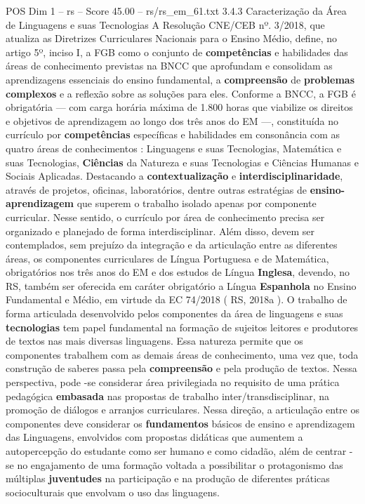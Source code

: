 \begin{textsample}{POS Dim 1 – rs – Score 45.00 – rs/rs\_em\_61.txt}  \label{ex:f1_pos_207}
3.4.3 Caracterização da Área de Linguagens e suas Tecnologias A Resolução CNE/CEB nº. 3/2018, que atualiza as Diretrizes Curriculares Nacionais para o Ensino Médio, define, no artigo 5º, inciso I, a FGB como o conjunto de \textbf{competências} e habilidades das áreas de conhecimento previstas na BNCC que aprofundam e consolidam as aprendizagens essenciais do ensino fundamental, a \textbf{compreensão} de \textbf{problemas} \textbf{complexos} e a reflexão sobre as soluções para eles.
Conforme a BNCC, a FGB é obrigatória — com carga horária máxima de 1.800 horas que viabilize os direitos e objetivos de aprendizagem ao longo dos três anos do EM —, constituída no currículo por \textbf{competências} específicas e habilidades em consonância com as quatro áreas de conhecimentos : Linguagens e suas Tecnologias, Matemática e suas Tecnologias, \textbf{Ciências} da Natureza e suas Tecnologias e Ciências Humanas e Sociais Aplicadas.
Destacando a \textbf{contextualização} e \textbf{interdisciplinaridade}, através de projetos, oficinas, laboratórios, dentre outras estratégias de \textbf{ensino-aprendizagem} que superem o trabalho isolado apenas por componente curricular.
Nesse sentido, o currículo por área de conhecimento precisa ser organizado e planejado de forma interdisciplinar.
Além disso, devem ser contemplados, sem prejuízo da integração e da articulação entre as diferentes áreas, os componentes curriculares de Língua Portuguesa e de Matemática, obrigatórios nos três anos do EM e dos estudos de Língua \textbf{Inglesa}, devendo, no RS, também ser oferecida em caráter obrigatório a Língua \textbf{Espanhola} no Ensino Fundamental e Médio, em virtude da EC 74/2018 ( RS, 2018a ).
O trabalho de forma articulada desenvolvido pelos componentes da área de linguagens e suas \textbf{tecnologias} tem papel fundamental na formação de sujeitos leitores e produtores de textos nas mais diversas linguagens.
Essa natureza permite que os componentes trabalhem com as demais áreas de conhecimento, uma vez que, toda construção de saberes passa pela \textbf{compreensão} e pela produção de textos.
Nessa perspectiva, pode -se considerar área privilegiada no requisito de uma prática pedagógica \textbf{embasada} nas propostas de trabalho inter/transdisciplinar, na promoção de diálogos e arranjos curriculares.
Nessa direção, a articulação entre os componentes deve considerar os \textbf{fundamentos} básicos de ensino e aprendizagem das Linguagens, envolvidos com propostas didáticas que aumentem a autopercepção do estudante como ser humano e como cidadão, além de centrar -se no engajamento de uma formação voltada a possibilitar o protagonismo das múltiplas \textbf{juventudes} na participação e na produção de diferentes práticas socioculturais que envolvam o uso das linguagens.

\end{textsample}
